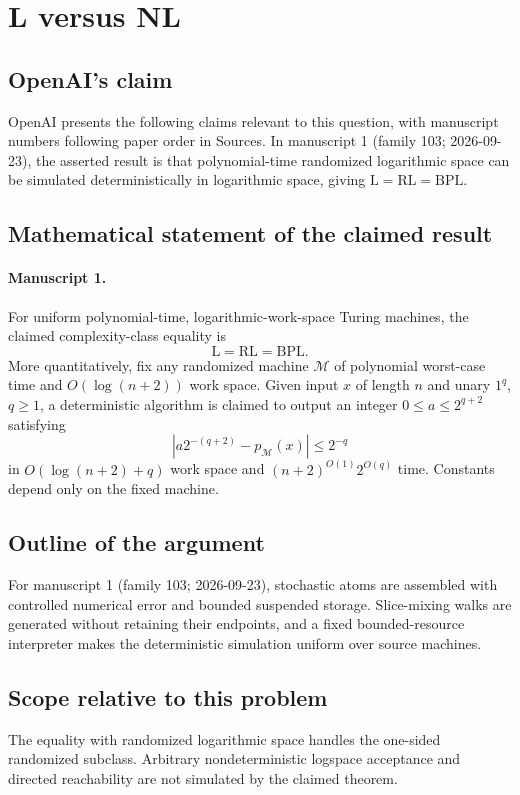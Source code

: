 \documentclass[11pt]{article}
\begin{document}
\section*{L versus NL}

\subsection{OpenAI's claim}
OpenAI presents the following claims relevant to this question, with manuscript numbers following paper order in Sources. In manuscript 1 (family 103; 2026-09-23), the asserted result is that polynomial-time randomized logarithmic space can be simulated deterministically in logarithmic space, giving $\mathrm L=\mathrm{RL}=\mathrm{BPL}$.

\subsection{Mathematical statement of the claimed result}
\paragraph{Manuscript 1.}
For uniform polynomial-time, logarithmic-work-space Turing machines, the claimed complexity-class equality is
\[
 \mathrm L=\mathrm{RL}=\mathrm{BPL}.
\]
More quantitatively, fix any randomized machine $\mathcal M$ of polynomial worst-case time and $O(\log(n+2))$ work space. Given input $x$ of length $n$ and unary $1^q$, $q\ge1$, a deterministic algorithm is claimed to output an integer $0\le a\le2^{q+2}$ satisfying
\[
 |a2^{-(q+2)}-p_{\mathcal M}(x)|\le2^{-q}
\]
in $O(\log(n+2)+q)$ work space and $(n+2)^{O(1)}2^{O(q)}$ time. Constants depend only on the fixed machine.

\subsection{Outline of the argument}
For manuscript 1 (family 103; 2026-09-23), stochastic atoms are assembled with controlled numerical error and bounded suspended storage. Slice-mixing walks are generated without retaining their endpoints, and a fixed bounded-resource interpreter makes the deterministic simulation uniform over source machines.

\subsection{Scope relative to this problem}
The equality with randomized logarithmic space handles the one-sided randomized subclass. Arbitrary nondeterministic logspace acceptance and directed reachability are not simulated by the claimed theorem.
\end{document}

